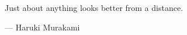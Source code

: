 \null
\vfill

\hfill \begin{minipage}{.75\textwidth}
Just about anything looks better from a distance.

\hfill --- Haruki Murakami 
\end{minipage}

\cleardoublepage
